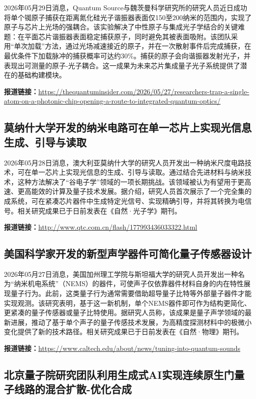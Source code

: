 \documentclass[12pt,a4paper]{ctexart}
\begin{document}
2026年05月29日消息，Quantum Source与魏茨曼科学研究所的研究人员近日成功将单个铷原子捕获在距离氮化硅光子谐振器表面仅150至200纳米的范围内，实现了原子与芯片上光场的强耦合。该实验解决了中性原子与集成光子学结合的关键难题：在平面芯片谐振器表面稳定捕获原子，同时避免其被表面吸附。该团队采用“单次加载”方法，通过光场减速接近的原子，并在一次散射事件后完成捕获，在最优条件下加载脉冲的捕获概率可达约30\%。捕获的原子会向谐振器发射光子，并表现出可测量的原子-光子耦合。这一成果为未来芯片集成量子光子系统提供了潜在的基础构建模块。

\noindent\textbf{报道链接：}\url{https://thequantuminsider.com/2026/05/27/researchers-trap-a-single-atom-on-a-photonic-chip-opening-a-route-to-integrated-quantum-optics/ }

\subsection{ 莫纳什大学开发的纳米电路可在单一芯片上实现光信息生成、引导与读取 }

2026年05月28日消息，澳大利亚莫纳什大学的研究人员开发出一种纳米尺度电路技术，可在单一芯片上实现光信息的生成、引导与读取。通过结合先进材料与纳米技术，这种方法解决了“谷电子学”领域的一项长期挑战。该领域被认为有望用于更高速、更高能效的计算及量子技术发展。据介绍，研究人员首次展示了一个完全集的成系统，可在紧凑芯片器件中生成特定光信号、实现精确引导，并将其转换为电信号。相关研究成果已于日前发表在《自然·光子学》期刊。

\noindent\textbf{报道链接：}\url{http://www.qtc.com.cn/flash/177993436033322.html }

\subsection{ 美国科学家开发的新型声学器件可简化量子传感器设计 }

2026年05月27日消息，美国加州理工学院与斯坦福大学的研究人员开发出一种名为“纳米机电系统”（NEMS）的器件，可使声子仅依靠器件材料自身的内在特性展现量子行为。此前，这类量子行为通常需要借助超导量子比特等外部量子器件才能实现观测。该研究表明，基于这一新机制，单个NEMS器件即可作为结构更简化、更紧凑的量子传感器或量子比特使用。据研究人员称，该成果是量子声学领域的最新进展，推动了基于单个声子的量子传感技术发展，为高精度探测材料中的极微小变化提供了新的技术路径。相关研究成果已于日前发表在《自然·物理》期刊。

\noindent\textbf{报道链接：}\url{https://www.caltech.edu/about/news/tuning-into-quantum-sounds }

\subsection{ 北京量子院研究团队利用生成式AI实现连续原生门量子线路的混合扩散-优化合成 }
\end{document}
